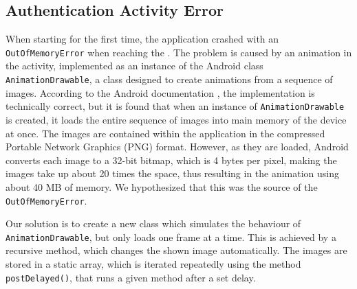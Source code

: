 \subsection{Authentication Activity Error}
When starting \launcher for the first time, the application crashed with an \lstinline{OutOfMemoryError} when reaching the \authenticationactivity.
The problem is caused by an animation in the activity, implemented as an instance of the Android class \lstinline{AnimationDrawable}, a class designed to create animations from a sequence of images.
According to the Android documentation \citet{androidreference}, the implementation is technically correct, but it is found that when an instance of \lstinline{AnimationDrawable} is created, it loads the entire sequence of images into main memory of the device at once.
The images are contained within the application in the compressed Portable Network Graphics (PNG) format.
However, as they are loaded, Android converts each image to a 32-bit bitmap, which is 4 bytes per pixel, making the images take up about 20 times the space, thus resulting in the animation using about 40 MB of memory. 
We hypothesized that this was the source of the \lstinline{OutOfMemoryError}.

Our solution is to create a new class which simulates the behaviour of \lstinline{AnimationDrawable}, but only loads one frame at a time.
This is achieved by a recursive method, which changes the shown image automatically.
The images are stored in a static array, which is iterated repeatedly using the method \lstinline|postDelayed()|, that runs a given method after a set delay.


